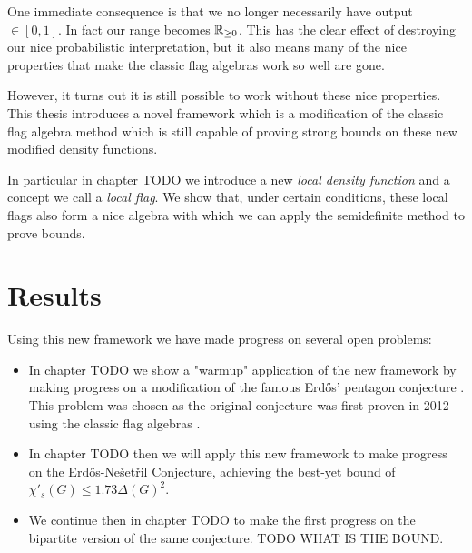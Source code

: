 One immediate consequence is that we no longer necessarily have output $\in [0,1]$. In
fact our range becomes $\mathbb{R}_{\geq 0}$. This has the clear effect of destroying our nice
probabilistic interpretation, but it also means many of the nice properties that make
the classic flag algebras work so well are gone.

However, it turns out it is still possible to work without these nice properties.
This thesis introduces a novel framework which is a modification of the classic flag algebra
method which is still capable of proving strong bounds on these new modified density functions.

In particular in chapter TODO we introduce a
new \textit{local density function} and a concept we call a \textit{local flag}.
We show that, under certain conditions, these local flags also form a nice algebra
with which we can apply the semidefinite method to prove bounds.

\section*{Results}

Using this new framework we have made progress on several open problems:
\begin{itemize}
    \item In chapter TODO we show a "warmup" application of the new framework by making progress on
        a modification of the famous Erd\H{o}s' pentagon conjecture \cite{erdos_pentagon_1984}.
        This problem was chosen as the original conjecture was first proven in 2012 using
        the classic flag algebras \cite{grzesikMaximumNumberFivecycles2012}.
    \item In chapter TODO then we will apply this new framework to make progress on the
        \hyperref[conj:erdos-nesetril]{Erd\H{o}s-Nešetřil Conjecture}, achieving the best-yet
        bound of $\chi'_s(G) \leq 1.73\Delta(G)^2$.
    \item We continue then in chapter TODO to make the first progress on the bipartite version of
        the same conjecture. TODO WHAT IS THE BOUND.
\end{itemize}
